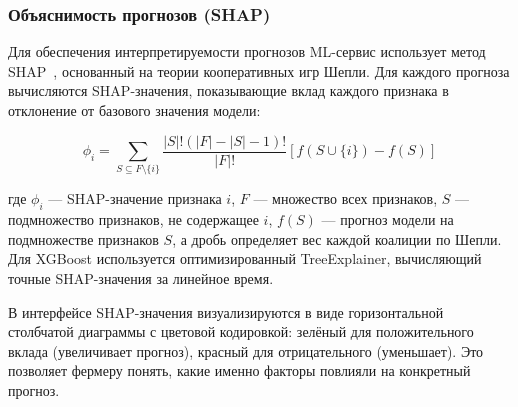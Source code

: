 \subsubsection{Объяснимость прогнозов (SHAP)}

Для обеспечения интерпретируемости прогнозов ML-сервис использует метод SHAP~\cite{SHAP}, основанный на теории кооперативных игр Шепли. Для каждого прогноза вычисляются SHAP-значения, показывающие вклад каждого признака в отклонение от базового значения модели:

$$\phi_i = \sum_{S \subseteq F \setminus \{i\}} \frac{|S|!(|F|-|S|-1)!}{|F|!} \left[ f(S \cup \{i\}) - f(S) \right]$$

где $\phi_i$ --- SHAP-значение признака $i$, $F$ --- множество всех признаков, $S$ --- подмножество признаков, не содержащее $i$, $f(S)$ --- прогноз модели на подмножестве признаков $S$, а дробь определяет вес каждой коалиции по Шепли. Для XGBoost используется оптимизированный TreeExplainer, вычисляющий точные SHAP-значения за линейное время.

В интерфейсе SHAP-значения визуализируются в виде горизонтальной столбчатой диаграммы с цветовой кодировкой: зелёный для положительного вклада (увеличивает прогноз), красный для отрицательного (уменьшает). Это позволяет фермеру понять, какие именно факторы повлияли на конкретный прогноз.
